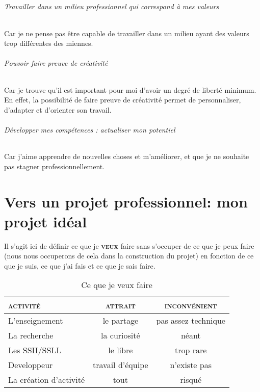 \documentclass[a4paper,12pt, draft]{report}
\newcommand{\tabTitle}[1]{\hfill{} \textsc{#1} \hfill{} }
\begin{document}
\paragraph{}
\subparagraph{Travailler dans un milieu professionnel qui correspond à mes valeurs}
Car je ne pense pas être capable de travailler dans un milieu ayant des valeurs trop différentes des miennes. 

\subparagraph{Pouvoir faire preuve de créativité}
Car je trouve qu'il est important pour moi d'avoir un degré de liberté minimum. En effet, la possibilité de faire preuve de créativité permet de personnaliser, d'adapter et d'orienter son travail.

\subparagraph{Développer mes compétences : actualiser mon potentiel}
Car j'aime apprendre de nouvelles choses et m'améliorer, et que je ne souhaite pas stagner professionnellement.

\chapter[Mon projet idéal]{Vers un projet professionnel: mon projet idéal}
Il s'agit ici de définir ce que je \textsc{\textbf{veux}} faire sans s'occuper de ce que je peux faire (nous nous occuperons de cela dans la construction du projet) en fonction de ce que je suis, ce que j'ai fais et ce que je sais faire.


\begin{table}[h]
\begin{center}
\begin{tabular}{|l|c|c|}
  \hline
  \tabTitle{activité} & \tabTitle{attrait} & \tabTitle{inconvénient}\\
  \hline
  \hline
  L'enseignement & le partage & pas assez technique\\
  \hline
  La recherche & la curiosité & néant \\
  \hline
  Les SSII\footnotemark{}/SSLL\footnotemark{} & le libre & trop rare\\
  \hline
  Developpeur & travail d'équipe & n'existe pas\footnotemark{}\\
  \hline
  La création d'activité & tout & risqué\\
  \hline
\end{tabular}
\end{center}
\caption{Ce que je veux faire}
\end{table}

\end{document}
